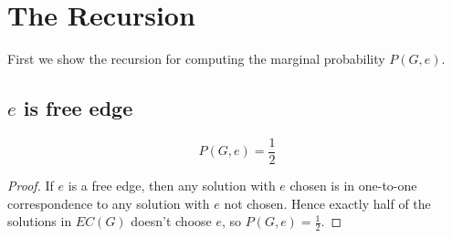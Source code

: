 \section{The Recursion}

First we show the recursion for computing the marginal probability $P(G, e)$.

\subsection{$e$ is free edge}
\begin{Prop}
	\[P(G,e) = \frac{1}{2}\]
\end{Prop}
\begin{proof}
	If $e$ is a free edge, then any solution with $e$ chosen is in one-to-one correspondence to any solution with $e$ not chosen. Hence exactly half of the solutions in $EC(G)$ doesn't choose $e$, so $P(G, e) = \frac{1}{2}$.
\end{proof}

